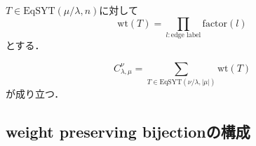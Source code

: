 \begin{defin}
  $T\in\text{EqSYT}(\mu/\lambda, n)$に対して
  \[
  \text{wt}(T)=\prod_{l:\text{edge label}}\text{factor}(l)
  \]
  とする．
\end{defin}

\begin{theo}
  \[
  C^{\nu}_{\lambda,\mu}=\sum_{T\in\text{EqSYT}(\nu/\lambda, |\mu|)}\text{wt}(T)
  \]
  が成り立つ．
\end{theo}




\subsection{weight preserving bijectionの構成}
